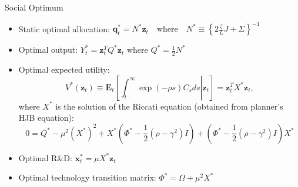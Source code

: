 \documentclass[
  10pt, %
  aspectratio=169,  %
  handout
]{beamer}
\theoremstyle{plain}
\begin{document}
%
\begin{frame}{Social Optimum }

  \label{optimal}
  \begin{itemize}
    \item Static optimal allocation: $\boldsymbol{q}_{t}^{*}=N^{*}\boldsymbol{z}_{t}\quad\text{where}\quad N^{*}\equiv\left\{ 2\frac{\zeta}{L}J+\Sigma\right\} ^{-1}$
    \item Optimal output: $Y_{t}^{*}=\boldsymbol{z}_{t}^{T}Q^{*}\boldsymbol{z}_{t}$
          where $Q^{*}=\frac{1}{2}N^{*}$
    \item Optimal expected utility:
          \[
            V^{*}\left(\boldsymbol{z}_{t}\right)\equiv\boldsymbol{E}_{t}\left[\left.\int_{t}^{\infty}\exp\left(-\rho s\right)C_{s}ds\right|\boldsymbol{z}_{t}\right]=\boldsymbol{z}_{t}^{T}X^{*}\boldsymbol{z}_{t},
          \]
          where $X^{*}$ is the solution of the Riccati equation (obtained
          from planner's HJB equation):
          \[
            0=Q^{*}-\mu^{2}\left(X^{*}\right)^{2}+X^{*}\left(\Phi^{*}-\frac{1}{2}\left(\rho-\gamma^{2}\right)I\right)+\left(\Phi^{*}-\frac{1}{2}\left(\rho-\gamma^{2}\right)I\right)X^{*}
          \]
    \item Optimal R\&D: $\boldsymbol{x}_{t}^{*}=\mu X^{*}\boldsymbol{z}_{t}$
    \item Optimal technology transition matrix: $\Phi^{*}=\Omega+\mu^{2}X^{*}$
  \end{itemize}
  \hyperlink{aggregation}{}
\end{frame}
%
\end{document}
